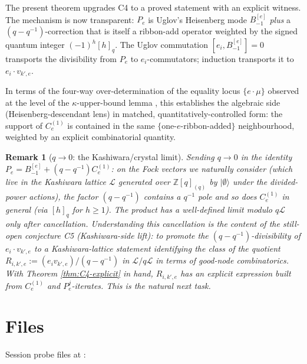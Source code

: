 \documentclass[11pt]{article}
\newtheorem{remark}[theorem]{Remark}
\theoremstyle{definition}
\newcommand{\vke}{v_{k',e}}
\newcommand{\Ce}{C_e^{(1)}}
\newcommand{\Bmi}{B_{-1}^{[e]}}
\begin{document}
The present theorem upgrades C4 to a proved statement with an explicit witness.
The mechanism is now transparent: $P_e$ is Uglov's Heisenberg mode $\Bmi$
\emph{plus} a $(q - q^{-1})$-correction that is itself a ribbon-add operator
weighted by the signed quantum integer $(-1)^h [h]_q$. The Uglov commutation
$[e_i, \Bmi] = 0$ transports the divisibility from $P_e$ to $e_i$-commutators;
induction transports it to $e_i \cdot \vke$.

In terms of the four-way over-determination of the equality locus $\{e \cdot \mu\}$
observed at the level of the $\kappa$-upper-bound lemma
\cite{Clio-kappa-upper-bound-2026-08-11}, this establishes the algebraic side
(Heisenberg-descendant lens) in matched, quantitatively-controlled form: the
support of $\Ce$ is contained in the same $\{$one-$e$-ribbon-added$\}$
neighbourhood, weighted by an explicit combinatorial quantity.

\begin{remark}[$q \to 0$: the Kashiwara/crystal limit]
\label{rem:crystal-limit}
Sending $q \to 0$ in the identity $P_e = \Bmi + (q - q^{-1}) \Ce$: on the
Fock vectors we naturally consider (which live in the Kashiwara lattice
$\mathcal L$ generated over $\mathbb Z[q]_{(q)}$ by $|\emptyset\rangle$ under the
divided-power actions), the factor $(q - q^{-1})$ contains a $q^{-1}$ pole and
so does $\Ce$ in general (via $[h]_q$ for $h \ge 1$). The product has a
well-defined limit modulo $q \mathcal L$ only after cancellation. Understanding
this cancellation is the content of the still-open conjecture C5
(Kashiwara-side lift): to promote the $(q - q^{-1})$-divisibility of
$e_i \cdot \vke$ to a Kashiwara-lattice statement identifying the class of the
quotient $R_{i,k',e} := (e_i \vke)/(q - q^{-1})$ in $\mathcal L / q \mathcal L$
in terms of good-node combinatorics. With Theorem \ref{thm:C4-explicit} in hand,
$R_{i,k',e}$ has an explicit expression built from $\Ce$ and $P_e^{j}$-iterates.
This is the natural next task.
\end{remark}

\section{Files}
\label{sec:files}

Session probe files at :
\end{document}

